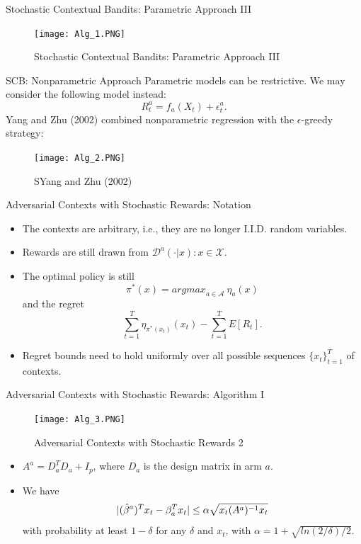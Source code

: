 \documentclass[english]{article}
\begin{document}
\item {Stochastic Contextual Bandits: Parametric Approach III}
    \begin{figure}
        \centering
        \texttt{[image: Alg\_1.PNG]}
        \label{Stochastic Contextual Bandits: Parametric Approach III}
        \caption{Stochastic Contextual Bandits: Parametric Approach III}
    \end{figure}


\item {SCB: Nonparametric Approach}
    Parametric models can be restrictive. We may consider the following model instead: \[
    R_t^a = f_a(X_t) + \epsilon_t^a.
    \]
    Yang and Zhu (2002) combined nonparametric regression with the $\epsilon$-greedy strategy:
    \begin{figure}
        \centering
        \texttt{[image: Alg\_2.PNG]}
        \label{Yang and Zhu (2002)}
        \caption{SYang and Zhu (2002)}
    \end{figure}


\item {Adversarial Contexts with Stochastic Rewards: Notation}
    \begin{itemize}
        \item The contexts are arbitrary, i.e., they are no longer I.I.D. random variables.
        \item Rewards are still drawn from $\mathcal{D}^a(\cdot | x): x \in \mathcal{X}$.
        \item The optimal policy is still \[
        \pi^\ast(x) = \textit{argmax}_{a \in \mathcal{A}}~\eta_a(x)
        \] and the regret \[
        \sum_{t = 1}^T \eta_{\pi^\ast(x_t)}(x_t) - \sum_{t = 1}^T E[R_t].
        \]
        \item Regret bounds need to hold uniformly over all possible sequences $\{x_t\}_{t = 1}^T$ of contexts.
    \end{itemize}


\item {Adversarial Contexts with Stochastic Rewards: Algorithm I}
    \begin{figure}
        \centering
        \texttt{[image: Alg\_3.PNG]}
                \label{Adversarial Contexts with Stochastic Rewards 1}
        \caption{Adversarial Contexts with Stochastic Rewards 2}
    \end{figure}
    
\begin{itemize}
\item $A^a = D_a^T D_a + I_p$, where $D_a$ is the design matrix in arm $a$.
\item We have \[
|(\Hat{\beta}^a)^T x_t - \beta_a^T x_t| \leq \alpha \sqrt{x_t (A^a)^{-1} x_t}
\] with probability at least $1 - \delta$ for any $\delta$ and $x_t$, with $\alpha = 1 + \sqrt{ln(2/\delta)/2}$.
\end{itemize}
\end{document}
